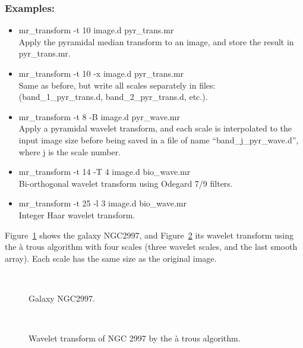 \subsubsection*{Examples:}
\begin{itemize}
\item mr\_transform -t 10 image.d pyr\_trans.mr \\
Apply the pyramidal median transform to an image, and store the
result in pyr\_trans.mr. 
\item mr\_transform -t 10 -x image.d pyr\_trans.mr \\
Same as before, but write all scales separately
in files: \\
 (band\_1\_pyr\_trans.d, band\_2\_pyr\_trans.d, etc.).
\item mr\_transform -t 8 -B image.d pyr\_wave.mr \\
Apply a pyramidal wavelet transform, and each scale is interpolated
to the input image size before being saved in a file of name 
``band\_j\_pyr\_wave.d'', where j is the scale number.
\item mr\_transform -t 14 -T 4 image.d bio\_wave.mr \\
Bi-orthogonal wavelet transform using Odegard 7/9 filters.
\item mr\_transform -t 25 -l 3 image.d bio\_wave.mr \\
Integer Haar wavelet transform.
\end{itemize}
Figure~\ref{fig_ngc} shows the galaxy NGC2997, and 
Figure~\ref{pl_pave_gala} its
wavelet transform using the \`a trous algorithm with four scales (three 
wavelet scales, and the last smooth array). Each scale has the same size
as the original image.

\begin{figure}[htb]
\centerline{
\hbox{
}}
\caption{Galaxy NGC2997.}
\label{fig_ngc}
\end{figure}

\begin{figure}[htb]
\centerline{
\hbox{
}}
\caption{Wavelet transform of NGC 2997 by the \`a trous algorithm.}
\label{pl_pave_gala}
\end{figure}


